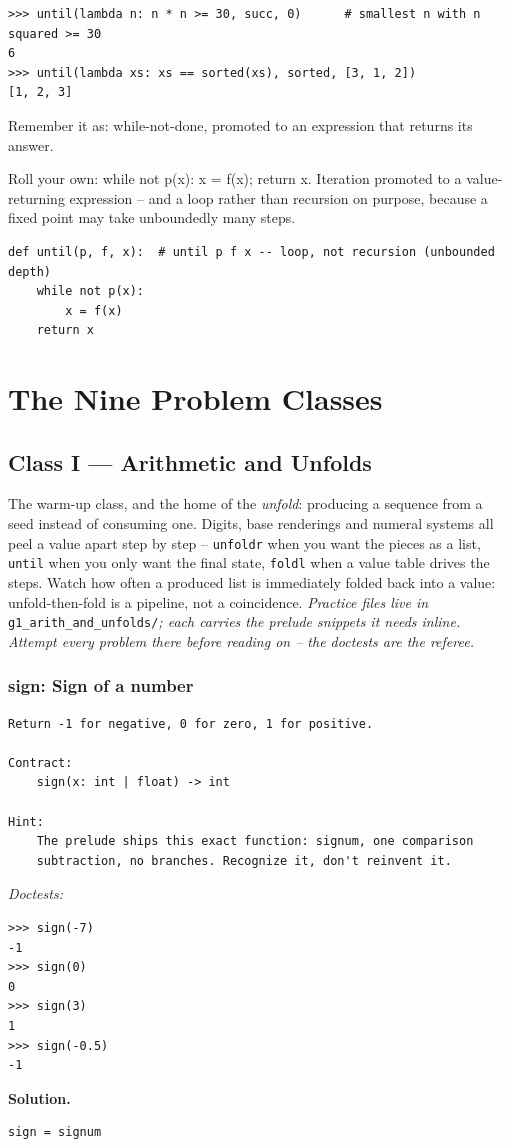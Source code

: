 \documentclass[11pt,letterpaper]{book}
\begin{document}
\begin{lstlisting}[style=spec]
>>> until(lambda n: n * n >= 30, succ, 0)      # smallest n with n squared >= 30
6
>>> until(lambda xs: xs == sorted(xs), sorted, [3, 1, 2])
[1, 2, 3]
\end{lstlisting}

Remember it as: while-not-done, promoted to an expression that returns its answer.


Roll your own: while not p(x): x = f(x); return x. Iteration promoted to a value-returning expression -- and a loop rather than recursion on purpose, because a fixed point may take unboundedly many steps.

\begin{lstlisting}[style=code]
def until(p, f, x):  # until p f x -- loop, not recursion (unbounded depth)
    while not p(x):
        x = f(x)
    return x
\end{lstlisting}
\part{The Nine Problem Classes}
\chapter{Class I --- Arithmetic and Unfolds}

The warm-up class, and the home of the \emph{unfold}: producing a sequence from
a seed instead of consuming one. Digits, base renderings and numeral systems all
peel a value apart step by step -- \texttt{unfoldr} when you want the pieces as
a list, \texttt{until} when you only want the final state, \texttt{foldl} when
a value table drives the steps. Watch how often a produced list is immediately
folded back into a value: unfold-then-fold is a pipeline, not a coincidence.
\medskip\noindent\textit{Practice files live in }\texttt{g1\_arith\_and\_unfolds/}\textit{;
each carries the prelude snippets it needs inline. Attempt every problem there
before reading on -- the doctests are the referee.}

\section{sign: Sign of a number}
\begin{lstlisting}[style=spec]
Return -1 for negative, 0 for zero, 1 for positive.

Contract:
    sign(x: int | float) -> int

Hint:
    The prelude ships this exact function: signum, one comparison
    subtraction, no branches. Recognize it, don't reinvent it.
\end{lstlisting}
\noindent\textit{Doctests:}
\begin{lstlisting}[style=spec]
>>> sign(-7)
-1
>>> sign(0)
0
>>> sign(3)
1
>>> sign(-0.5)
-1
\end{lstlisting}
\noindent\textbf{Solution.}
\begin{lstlisting}[style=code]
sign = signum
\end{lstlisting}
\end{document}
